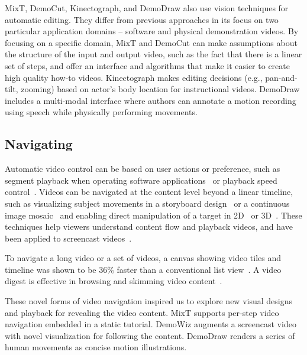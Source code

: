 MixT, DemoCut, Kinectograph, and DemoDraw also use vision techniques for automatic editing. They differ from previous approaches in its focus on two particular application domains -- software and physical demonstration videos.
%
By focusing on a specific domain, MixT and DemoCut can make assumptions about the structure of the input and output video, such as the fact that there is a linear set of steps, and offer an interface and algorithms that make it easier to create high quality how-to videos.
%
Kinectograph makes editing decisions (e.g., pan-and-tilt, zooming) based on actor's body location for instructional videos.
%
DemoDraw includes a multi-modal interface where authors can annotate a motion recording using speech while physically performing movements.



\subsection{Navigating}
Automatic video control can be based on user actions or preference, such as segment playback when operating software applications~\cite{Pongnumkul:2011ju} or playback speed control~\cite{Cheng:2009:SUV:1518701.1518823}.
%
Videos can be navigated at the content level beyond a linear timeline, such as visualizing subject movements in a storyboard design~\cite{goldman2006schematic} or a continuous image mosaic~\cite{Teodosio:2005:SS:1047936.1047940} and enabling direct manipulation of a target in 2D~\cite{Dragicevic:2008:VBD:1357054.1357096,Goldman:2008:VOA:1449715.1449719,Karrer:2008:DDM:1357054.1357097} or 3D~\cite{Nguyen:2013:DMV:2470654.2466150}.
%
These techniques help viewers understand content flow and playback videos, and have been applied to screencast videos~\cite{Denoue:2013:RDM:2451176.2451190,Nguyen:2015:MST:2702123.2702209}.

To navigate a long video or a set of videos, a canvas showing video tiles and timeline was shown to be 36\% faster than a conventional list view~\cite{Al-Hajri:2014:VPH:2611105.2557106}. A video digest is effective in browsing and skimming video content~\cite{Pavel:2014:VDB:2642918.2647400}.

These novel forms of video navigation inspired us to explore new visual designs and playback for revealing the video content.
%
MixT supports per-step video navigation embedded in a static tutorial.
%
DemoWiz augments a screencast video with novel visualization for following the content.
%
DemoDraw renders a series of human movements as concise motion illustrations.

